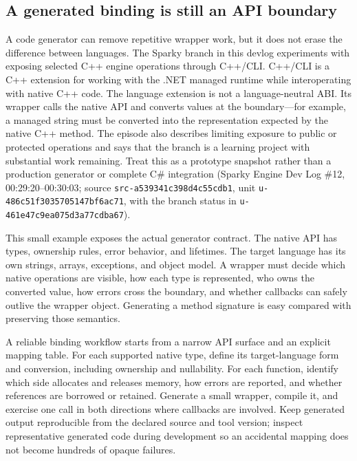 \subsection{A generated binding is still an API boundary}\label{a-generated-binding-is-still-an-api-boundary}

A code generator can remove repetitive wrapper work, but it does not erase the difference between languages. The Sparky branch in this devlog experiments with exposing selected C++ engine operations through C++/CLI. C++/CLI is a C++ extension for working with the .NET managed runtime while interoperating with native C++ code. The language extension is not a language-neutral ABI. Its wrapper calls the native API and converts values at the boundary---for example, a managed string must be converted into the representation expected by the native C++ method. The episode also describes limiting exposure to public or protected operations and says that the branch is a learning project with substantial work remaining. Treat this as a prototype snapshot rather than a production generator or complete C\# integration (Sparky Engine Dev Log \#12, 00:29:20--00:30:03; source \texttt{src-a539341c398d4c55cdb1}, unit \texttt{u-486c51f3035705147bf6ac71}, with the branch status in \texttt{u-461e47c9ea075d3a77cdba67}).

This small example exposes the actual generator contract. The native API has types, ownership rules, error behavior, and lifetimes. The target language has its own strings, arrays, exceptions, and object model. A wrapper must decide which native operations are visible, how each type is represented, who owns the converted value, how errors cross the boundary, and whether callbacks can safely outlive the wrapper object. Generating a method signature is easy compared with preserving those semantics.

A reliable binding workflow starts from a narrow API surface and an explicit mapping table. For each supported native type, define its target-language form and conversion, including ownership and nullability. For each function, identify which side allocates and releases memory, how errors are reported, and whether references are borrowed or retained. Generate a small wrapper, compile it, and exercise one call in both directions where callbacks are involved. Keep generated output reproducible from the declared source and tool version; inspect representative generated code during development so an accidental mapping does not become hundreds of opaque failures.

